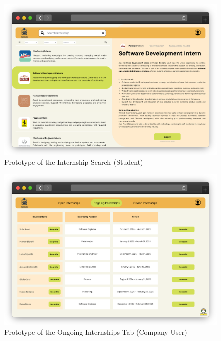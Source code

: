 \begin{figure}[H]
    \centering
    \includegraphics[width=\textwidth]{Images/userInterface-StudentSearch.png}
    \caption{Prototype of the Internship Search (Student)}
    \label{fig:StudentSearch-user_interface}
\end{figure}

\begin{figure}[H]
    \centering
    \includegraphics[width=\textwidth]{Images/userInterface-CompanyOngoing.png}
    \caption{Prototype of the Ongoing Internships Tab (Company User)}
    \label{fig:CompanyOngoing-user_interface}
\end{figure}
